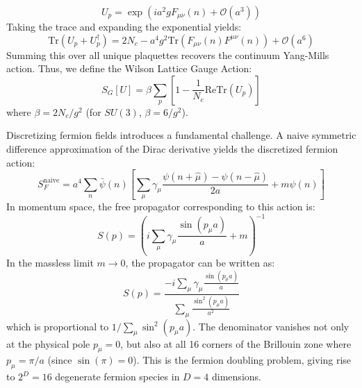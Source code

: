 \begin{equation}
U_p = \exp \left( i a^2 g F_{\mu\nu}(n) + \mathcal{O}(a^3) \right)
\label{eq:plaquette_expansion}
\end{equation}
Taking the trace and expanding the exponential yields:
\begin{equation}
\text{Tr} \left( U_p + U_p^\dagger \right) = 2 N_c - a^4 g^2 \text{Tr} \left( F_{\mu\nu}(n) F^{\mu\nu}(n) \right) + \mathcal{O}(a^6)
\label{eq:plaquette_trace}
\end{equation}
Summing this over all unique plaquettes recovers the continuum Yang-Mills action. Thus, we define the Wilson Lattice Gauge Action:
\begin{equation}
S_G[U] = \beta \sum_{p} \left[ 1 - \frac{1}{N_c} \mathrm{Re} \text{Tr} (U_p) \right]
\label{eq:wilson_gauge_action}
\end{equation}
where $\beta = 2N_c/g^2$ (for $SU(3)$, $\beta = 6/g^2$).

Discretizing fermion fields introduces a fundamental challenge. A naive symmetric difference approximation of the Dirac derivative yields the discretized fermion action:
\begin{equation}
S_F^{\mathrm{naive}} = a^4 \sum_{n} \bar{\psi}(n) \left[ \sum_\mu \gamma_\mu \frac{\psi(n+\hat{\mu}) - \psi(n-\hat{\mu})}{2a} + m \psi(n) \right]
\label{eq:naive_fermion_action}
\end{equation}
In momentum space, the free propagator corresponding to this action is:
\begin{equation}
S(p) = \left( i \sum_\mu \gamma_\mu \frac{\sin(p_\mu a)}{a} + m \right)^{-1}
\label{eq:naive_propagator}
\end{equation}
In the massless limit $m \to 0$, the propagator can be written as:
\begin{equation}
S(p) = \frac{-i \sum_\mu \gamma_\mu \frac{\sin(p_\mu a)}{a}}{\sum_\mu \frac{\sin^2(p_\mu a)}{a^2}}
\label{eq:naive_propagator_massless}
\end{equation}
which is proportional to $1/\sum_\mu \sin^2(p_\mu a)$. The denominator vanishes not only at the physical pole $p_\mu = 0$, but also at all 16 corners of the Brillouin zone where $p_\mu = \pi/a$ (since $\sin(\pi) = 0$). This is the fermion doubling problem, giving rise to $2^D = 16$ degenerate fermion species in $D=4$ dimensions.

